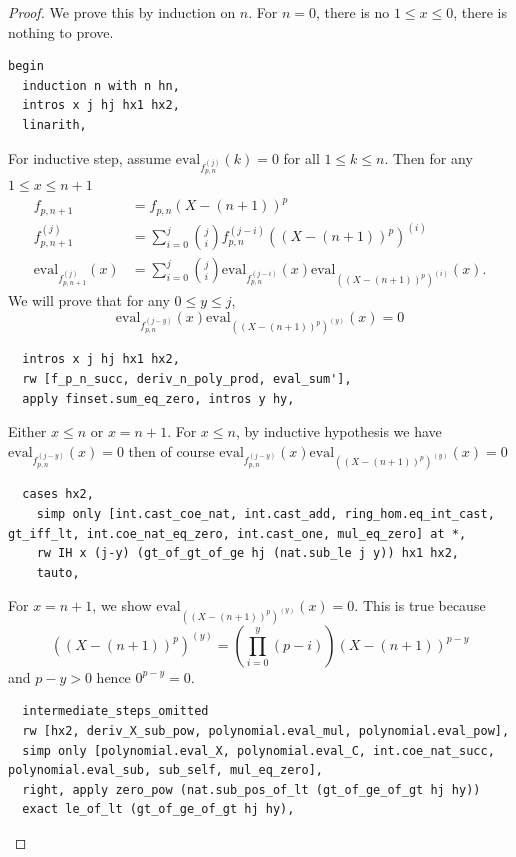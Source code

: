 \documentclass{report}
\theoremstyle{definition}
\begin{document}
\begin{proof}
We prove this by induction on $n$.
For $n=0$, there is no $1\le x\le0$, there is nothing to prove.
\begin{verbatim}
begin
  induction n with n hn,
  intros x j hj hx1 hx2,
  linarith,
\end{verbatim}
For inductive step, assume $\mathrm{eval}_{f_{p,n}^{(j)}}(k) = 0$ for all $1\le k\le n$. Then for any $1\le x\le n+1$
\begin{equation*}
\begin{aligned}
f_{p,n+1}&=f_{p,n}(X-(n+1))^p\\
f_{p,n+1}^{(j)}&=\sum_{i=0}^j{j\choose i}f_{p,n}^{(j-i)}\left((X-(n+1))^p\right)^{(i)}\\
\mathrm{eval}_{f_{p,n+1}^{(j)}}(x)&=\sum_{i=0}^j{j\choose i}\mathrm{eval}_{f_{p,n}^{(j-i)}}(x)\mathrm{eval}_{\left((X-(n+1))^p\right)^{(i)}}(x).
\end{aligned}
\end{equation*} 
We will prove that for any $0\le y\le j$, 
$$\mathrm{eval}_{f_{p,n}^{(j-y)}}(x)\mathrm{eval}_{\left((X-(n+1))^p\right)^{(y)}}(x)=0$$

\begin{verbatim}
  intros x j hj hx1 hx2,
  rw [f_p_n_succ, deriv_n_poly_prod, eval_sum'], 
  apply finset.sum_eq_zero, intros y hy,
\end{verbatim}

Either $x\le n$ or $x = n+1$. For $x\le n$, by inductive hypothesis we have $\mathrm{eval}_{f_{p,n}^{(j-y)}}(x)=0$ then of course $\mathrm{eval}_{f_{p,n}^{(j-y)}}(x)\mathrm{eval}_{\left((X-(n+1))^p\right)^{(y)}}(x)=0$

\begin{verbatim}
  cases hx2,
    simp only [int.cast_coe_nat, int.cast_add, ring_hom.eq_int_cast, gt_iff_lt, int.coe_nat_eq_zero, int.cast_one, mul_eq_zero] at *,
    rw IH x (j-y) (gt_of_gt_of_ge hj (nat.sub_le j y)) hx1 hx2,
    tauto,
\end{verbatim}

For $x=n+1$, we show $\mathrm{eval}_{\left((X-(n+1))^p\right)^{(y)}}(x)=0$. This is true because
$$
\left((X-(n+1))^p\right)^{(y)}=\left(\prod_{i=0}^y(p-i)\right)(X-(n+1))^{p-y}
$$
and $p-y>0$ hence $0^{p-y}=0$.
\begin{verbatim}
  intermediate_steps_omitted
  rw [hx2, deriv_X_sub_pow, polynomial.eval_mul, polynomial.eval_pow], 
  simp only [polynomial.eval_X, polynomial.eval_C, int.coe_nat_succ, polynomial.eval_sub, sub_self, mul_eq_zero], 
  right, apply zero_pow (nat.sub_pos_of_lt (gt_of_ge_of_gt hj hy))
  exact le_of_lt (gt_of_ge_of_gt hj hy),
\end{verbatim}
\end{proof}
\end{document}
